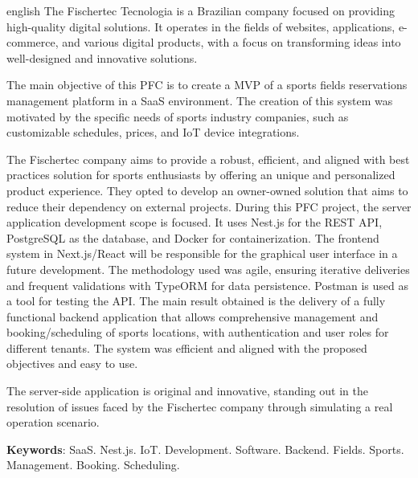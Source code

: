 		

\begin{resumo}[Abstract]
	\SingleSpacing
	\begin{otherlanguage*}{english}
		The Fischertec Tecnologia is a Brazilian company focused on providing high-quality digital solutions. It operates in the fields of websites, applications, e-commerce, and various digital products, with a focus on transforming ideas into well-designed and innovative solutions.

		The main objective of this PFC is to create a \acrfull{MVP} of a sports fields reservations management platform in a \acrfull{SaaS} environment. The creation of this system was motivated by the specific needs of sports industry companies, such as customizable schedules, prices, and IoT device integrations.

		The Fischertec company aims to provide a robust, efficient, and aligned with best practices solution for sports enthusiasts by offering an unique and personalized product experience. They opted to develop an owner-owned solution that aims to reduce their dependency on external projects.
		During this PFC project, the server application development scope is focused. It uses Nest.js for the \acrshort{REST} \acrshort{API}, PostgreSQL as the database, and Docker for containerization. The frontend system in Next.js/React will be responsible for the graphical user interface in a future development.
		The methodology used was agile, ensuring iterative deliveries and frequent validations with TypeORM for data persistence. Postman is used as a tool for testing the \acrshort{API}.
		The main result obtained is the delivery of a fully functional backend application that allows comprehensive management and booking/scheduling of sports locations, with authentication and user roles for different tenants. The system was efficient and aligned with the proposed objectives and easy to use.

		The server-side application is original and innovative, standing out in the resolution of issues faced by the Fischertec company through simulating a real operation scenario.
		
		\textbf{Keywords}: \acrshort{SaaS}. Nest.js. \acrshort{IoT}. Development. Software. Backend. Fields. Sports. Management. Booking. Scheduling.
	\end{otherlanguage*}
\end{resumo}

